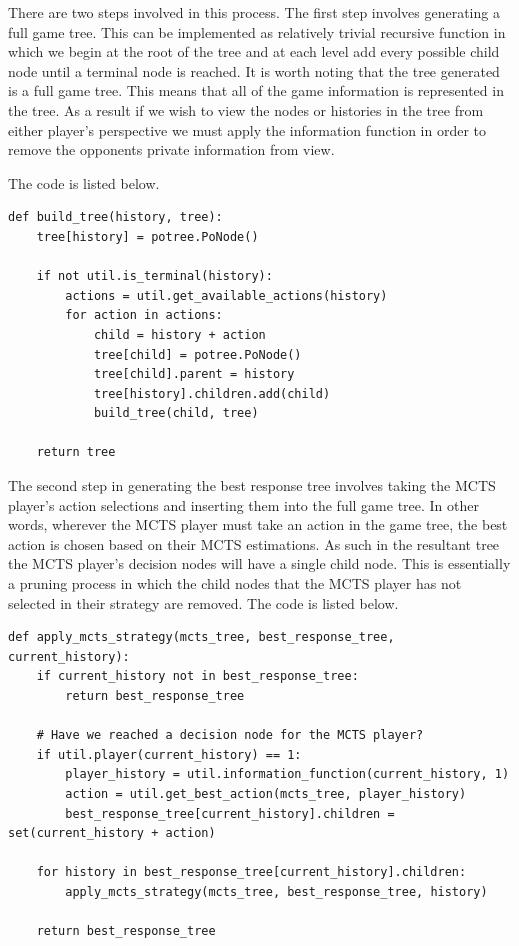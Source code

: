 There are two steps involved in this process.
The first step involves generating a full game tree.
This can be implemented as relatively trivial recursive function in which we begin at the root of the
tree and at each level add every possible child node until a terminal node is reached.
It is worth noting that the tree generated is a full game tree.
This means that all of the game information is represented in the tree.
As a result if we wish to view the nodes or histories in the tree from either player's perspective we must apply
the information function in order to remove the opponents private information from view.

The code is listed below.

\begin{lstlisting}[style=Python]
def build_tree(history, tree):
    tree[history] = potree.PoNode()

    if not util.is_terminal(history):
        actions = util.get_available_actions(history)
        for action in actions:
            child = history + action
            tree[child] = potree.PoNode()
            tree[child].parent = history
            tree[history].children.add(child)
            build_tree(child, tree)

    return tree
\end{lstlisting}

The second step in generating the best response tree involves taking the MCTS player's action
selections and inserting them into the full game tree\citep{heinrich2017reinforcement}.
In other words, wherever the MCTS player must take an action in the game tree, the best action is chosen
based on their MCTS estimations.
As such in the resultant tree the MCTS player's decision nodes will have
a single child node.
This is essentially a pruning process in which the child nodes that the MCTS player has
not selected in their strategy are removed.
The code is listed below.

\begin{lstlisting}[style=Python]
def apply_mcts_strategy(mcts_tree, best_response_tree, current_history):
    if current_history not in best_response_tree:
        return best_response_tree

    # Have we reached a decision node for the MCTS player?
    if util.player(current_history) == 1:
        player_history = util.information_function(current_history, 1)
        action = util.get_best_action(mcts_tree, player_history)
        best_response_tree[current_history].children = set(current_history + action)

    for history in best_response_tree[current_history].children:
        apply_mcts_strategy(mcts_tree, best_response_tree, history)

    return best_response_tree
\end{lstlisting}

